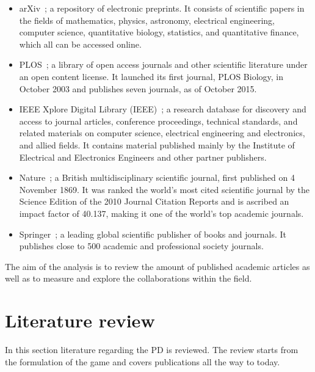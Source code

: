 \documentclass{article}
\theoremstyle{definition}
\begin{document}
\begin{multicols}{2}
    \begin{itemize}
        \item arXiv~\cite{mckiernan2000}; a repository of electronic preprints.
        It consists of scientific
        papers in the fields of mathematics, physics, astronomy, electrical engineering,
        computer science, quantitative biology, statistics, and quantitative finance,
        which all can be accessed online.
        \item PLOS~\cite{plos}; a library of open access journals and other scientific literature
        under an open content license. It launched its first journal, PLOS Biology,
        in October 2003 and publishes seven journals, as of October 2015.
        \item IEEE Xplore Digital Library (IEEE)~\cite{ieee}; a research database for discovery
        and access to journal articles, conference proceedings, technical standards,
        and related materials on computer science, electrical engineering and electronics,
        and allied fields. It contains material published mainly by the Institute of
        Electrical and Electronics Engineers and other partner publishers. 
        \item Nature~\cite{nature}; a British multidisciplinary scientific journal,
        first published on 4 November 1869. It was ranked the world's most cited
        scientific journal by the Science Edition of the 2010 Journal Citation Reports
        and is ascribed an impact factor of 40.137, making it one of the world's
        top academic journals.
        \item Springer~\cite{springer}; a leading global scientific publisher of
        books and journals. It publishes close to 500 academic and professional
        society journals.
    \end{itemize}
\end{multicols}

The aim of the analysis is to review the amount of published academic articles
as well as to measure and explore the collaborations within the field.

\section{Literature review}\label{section:timeline}

In this section literature regarding the PD is reviewed. The
review starts from the formulation of the game and covers publications all the
way to today.
\end{document}
